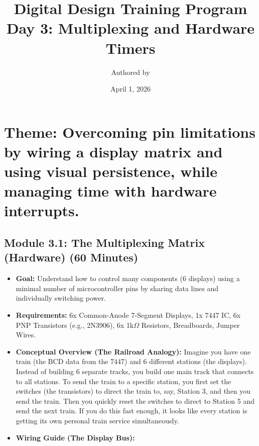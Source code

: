 \documentclass[11pt,a4paper]{article}
\title{Digital Design Training Program \\ \large Day 3: Multiplexing and Hardware Timers}
\author{Authored by }
\date{April 1, 2026}
\begin{document}
\maketitle

\section*{Theme: Overcoming pin limitations by wiring a display matrix and using visual persistence, while managing time with hardware interrupts.}

\subsection*{Module 3.1: The Multiplexing Matrix (Hardware) (60 Minutes)}

\begin{itemize}
    \item \textbf{Goal:} Understand how to control many components (6 displays) using a minimal number of microcontroller pins by sharing data lines and individually switching power.
    \item \textbf{Requirements:} 6x Common-Anode 7-Segment Displays, 1x 7447 IC, 6x PNP Transistors (e.g., 2N3906), 6x 1k$\Omega$ Resistors, Breadboards, Jumper Wires.
    \item \textbf{Conceptual Overview (The Railroad Analogy):} Imagine you have one train (the BCD data from the 7447) and 6 different stations (the displays). Instead of building 6 separate tracks, you build one main track that connects to all stations. To send the train to a specific station, you first set the switches (the transistors) to direct the train to, say, Station 3, and then you send the train. Then you quickly reset the switches to direct to Station 5 and send the next train. If you do this fast enough, it looks like every station is getting its own personal train service simultaneously.
    \item \textbf{Wiring Guide (The Display Bus):}
\end{itemize}
\end{document}
